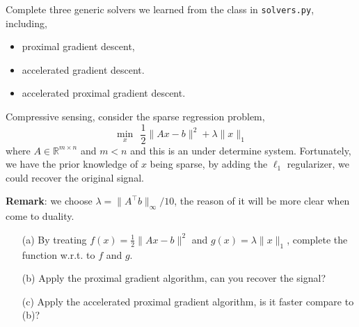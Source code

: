 \documentclass[10pt]{article}
\begin{document}
\begin{problem}[Problem 4]
Complete three generic solvers we learned from the class in \texttt{solvers.py}, including,
\begin{itemize}
\item proximal gradient descent,
\item accelerated gradient descent.
\item accelerated proximal gradient descent.
\end{itemize}
\end{problem}

\begin{solution}[Solution]
\end{solution}

\begin{problem}[Problem 5]
Compressive sensing, consider the sparse regression problem,
\[
\min_x~~\frac{1}{2}\|Ax - b\|^2 + \lambda \|x\|_1
\]
where \( A\in\mathbb{R}^{m \times n} \) and \( m < n \) and this is an under determine system.
Fortunately, we have the prior knowledge of \( x \) being sparse, by adding the \( \ell_1 \) regularizer, we could recover the original signal.

\vskip 8pt \noindent
{\bf Remark}: we choose \( \lambda = \|A^\top b\|_\infty/10 \), the reason of it will be more clear when come to duality.

\begin{enumerate}[label=(\alph*)]
\item[(a)] By treating \( f(x) = \frac{1}{2}\|Ax - b\|^2 \) and \( g(x) = \lambda \|x\|_1 \), complete the function w.r.t. to \( f \) and \( g \).
\item[(b)] Apply the proximal gradient algorithm, can you recover the signal?
\item[(c)] Apply the accelerated proximal gradient algorithm, is it faster compare to (b)?
\end{enumerate}
\end{problem}
\end{document}
